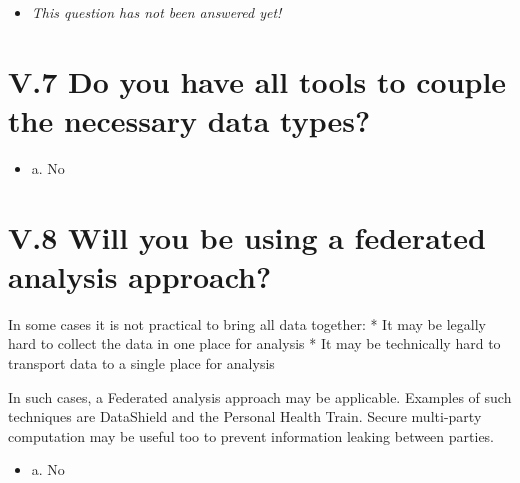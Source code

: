 \documentclass[a4paper,12pt]{report}
\begin{document}
\begin{itemize}
  \item[\XSolidBrush] \textit{This question has not been answered yet!}
\end{itemize}
  


\section*{\protect\textcolor{colorSecId}{V.7} Do you have all tools to couple the necessary data types?}

\label{83438863-0aa0-4458-b14b-2b2c0d4f811d.dc4f1dc7-4608-45f9-8503-aa05536f4d97}






\begin{itemize}
  \item[\CheckmarkBold] a. No
\end{itemize}






\section*{\protect\textcolor{colorSecId}{V.8} Will you be using a federated analysis approach?}

\label{83438863-0aa0-4458-b14b-2b2c0d4f811d.e1dba221-ad5a-474e-a2e3-9b4e472959fa}




\noindent
\begin{markdown}
In some cases it is not practical to bring all data together:
* It may be legally hard to collect the data in one place for analysis
* It may be technically hard to transport data to a single place for analysis

In such cases, a Federated analysis approach may be applicable. Examples of such techniques are DataShield and the Personal Health Train. Secure multi-party computation may be useful too to prevent information leaking between parties.
\end{markdown}



\begin{itemize}
  \item[\CheckmarkBold] a. No
\end{itemize}
\end{document}
